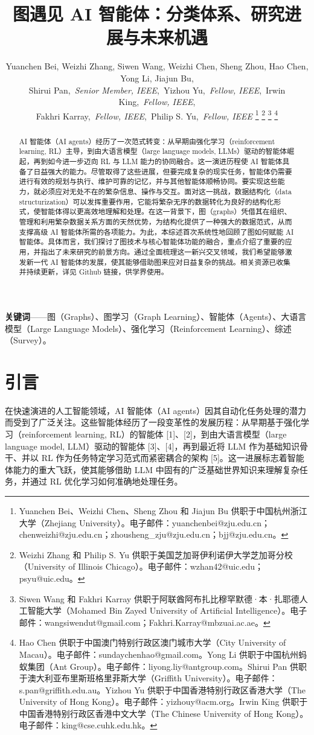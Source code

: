 \documentclass[10pt,UTF8,fontset=fandol]{ctexart}
\title{\textbf{图遇见 AI 智能体：分类体系、研究进展与未来机遇}}
\author{Yuanchen Bei, Weizhi Zhang, Siwen Wang, Weizhi Chen, Sheng Zhou, Hao Chen, Yong Li, Jiajun Bu,\\
Shirui Pan,~\textit{Senior Member, IEEE},~Yizhou Yu,~\textit{Fellow, IEEE},~Irwin King,~\textit{Fellow, IEEE},\\
Fakhri Karray,~\textit{Fellow, IEEE},~Philip S. Yu,~\textit{Fellow, IEEE}%
\thanks{Yuanchen Bei、Weizhi Chen、Sheng Zhou 和 Jiajun Bu 供职于中国杭州浙江大学（Zhejiang University）。电子邮件：yuanchenbei@zju.edu.cn；chenweizhi@zju.edu.cn；zhousheng\_zju@zju.edu.cn；bjj@zju.edu.cn。}%
\thanks{Weizhi Zhang 和 Philip S. Yu 供职于美国芝加哥伊利诺伊大学芝加哥分校（University of Illinois Chicago）。电子邮件：wzhan42@uic.edu；psyu@uic.edu。}%
\thanks{Siwen Wang 和 Fakhri Karray 供职于阿联酋阿布扎比穆罕默德·本·扎耶德人工智能大学（Mohamed Bin Zayed University of Artificial Intelligence）。电子邮件：wangsiwendut@gmail.com；Fakhri.Karray@mbzuai.ac.ae。}%
\thanks{Hao Chen 供职于中国澳门特别行政区澳门城市大学（City University of Macau）。电子邮件：sundaychenhao@gmail.com。Yong Li 供职于中国杭州蚂蚁集团（Ant Group）。电子邮件：liyong.liy@antgroup.com。Shirui Pan 供职于澳大利亚布里斯班格里菲斯大学（Griffith University）。电子邮件：s.pan@griffith.edu.au。Yizhou Yu 供职于中国香港特别行政区香港大学（The University of Hong Kong）。电子邮件：yizhouy@acm.org。Irwin King 供职于中国香港特别行政区香港中文大学（The Chinese University of Hong Kong）。电子邮件：king@cse.cuhk.edu.hk。}%
}
\date{}
\begin{document}
\maketitle

\begin{abstract}
\noindent AI 智能体（AI agents）经历了一次范式转变：从早期由强化学习（reinforcement learning, RL）主导，到由大语言模型（large language models, LLMs）驱动的智能体崛起，再到如今进一步迈向 RL 与 LLM 能力的协同融合。这一演进历程使 AI 智能体具备了日益强大的能力。尽管取得了这些进展，但要完成复杂的现实任务，智能体仍需要进行有效的规划与执行、维护可靠的记忆，并与其他智能体顺畅协同。要实现这些能力，就必须应对无处不在的繁杂信息、操作与交互。面对这一挑战，数据结构化（data structurization）可以发挥重要作用，它能将繁杂无序的数据转化为良好的结构化形式，使智能体得以更高效地理解和处理。在这一背景下，图（graphs）凭借其在组织、管理和利用繁杂数据关系方面的天然优势，为结构化提供了一种强大的数据范式，从而支撑高级 AI 智能体所需的各项能力。为此，本综述首次系统性地回顾了图如何赋能 AI 智能体。具体而言，我们探讨了图技术与核心智能体功能的融合，重点介绍了重要的应用，并指出了未来研究的前景方向。通过全面梳理这一新兴交叉领域，我们希望能够激发新一代 AI 智能体的发展，使其能够借助图来应对日益复杂的挑战。相关资源已收集并持续更新，详见 Github 链接，供学界使用。
\end{abstract}

\noindent\textbf{关键词}——图（Graphs）、图学习（Graph Learning）、智能体（Agents）、大语言模型（Large Language Models）、强化学习（Reinforcement Learning）、综述（Survey）。

\section{引言}

在快速演进的人工智能领域，AI 智能体（AI agents）因其自动化任务处理的潜力而受到了广泛关注。这些智能体经历了一段变革性的发展历程：从早期基于强化学习（reinforcement learning, RL）的智能体 [1]、[2]，到由大语言模型（large language model, LLM）驱动的智能体 [3]、[4]，再到最近将 LLM 作为基础知识骨干、并以 RL 作为任务特定学习范式而紧密耦合的架构 [5]。这一进展标志着智能体能力的重大飞跃，使其能够借助 LLM 中固有的广泛基础世界知识来理解复杂任务，并通过 RL 优化学习如何准确地处理任务。
\end{document}
